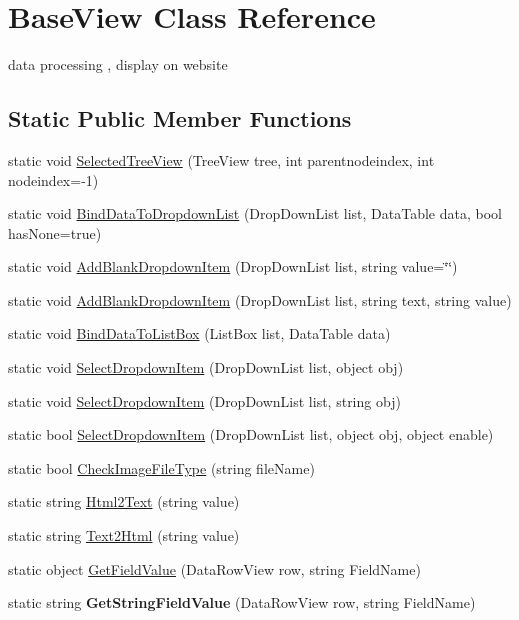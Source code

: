 \hypertarget{class_base_view}{\section{Base\-View Class Reference}
\label{class_base_view}
}


data processing , display on website  


\subsection*{Static Public Member Functions}
\begin{DoxyCompactItemize}
\item 
static void \hyperlink{class_base_view_add5facb001f67d1b233c739fd05f4522}{Selected\-Tree\-View} (Tree\-View tree, int parentnodeindex, int nodeindex=-\/1)
\item 
static void \hyperlink{class_base_view_a552808e7592fa857908c1cd62b962b62}{Bind\-Data\-To\-Dropdown\-List} (Drop\-Down\-List list, Data\-Table data, bool has\-None=true)
\item 
static void \hyperlink{class_base_view_a5c9efd93a389bbba53592f94e0c7e4bf}{Add\-Blank\-Dropdown\-Item} (Drop\-Down\-List list, string value=\char`\"{}\char`\"{})
\item 
static void \hyperlink{class_base_view_a11cb5505515d8022f035db42c6684ec4}{Add\-Blank\-Dropdown\-Item} (Drop\-Down\-List list, string text, string value)
\item 
static void \hyperlink{class_base_view_a9eefe3281f459553f95b598b8874b4ea}{Bind\-Data\-To\-List\-Box} (List\-Box list, Data\-Table data)
\item 
static void \hyperlink{class_base_view_a7c6c865233372bb21e52263d36dc06eb}{Select\-Dropdown\-Item} (Drop\-Down\-List list, object obj)
\item 
static void \hyperlink{class_base_view_af294e032b15c0d9f53e81a96db2c9847}{Select\-Dropdown\-Item} (Drop\-Down\-List list, string obj)
\item 
static bool \hyperlink{class_base_view_a9d7585ad518d5342c977dcaf50e4b98b}{Select\-Dropdown\-Item} (Drop\-Down\-List list, object obj, object enable)
\item 
static bool \hyperlink{class_base_view_a1ea899a45694c9a791f3bcbc0e53fe5d}{Check\-Image\-File\-Type} (string file\-Name)
\item 
static string \hyperlink{class_base_view_a980330f224af0bbc20a91d800cbf714a}{Html2\-Text} (string value)
\item 
static string \hyperlink{class_base_view_ac67acc0a12f0cf0a298a1f5a89eb4785}{Text2\-Html} (string value)
\item 
static object \hyperlink{class_base_view_a149c526459bc52ffc76d77110d8b55be}{Get\-Field\-Value} (Data\-Row\-View row, string Field\-Name)
\item 
\hypertarget{class_base_view_abefa3bdf34d884958b438d1b957a2b5d}{static string {\bfseries Get\-String\-Field\-Value} (Data\-Row\-View row, string Field\-Name)}\label{class_base_view_abefa3bdf34d884958b438d1b957a2b5d}


\end{DoxyCompactItemize}

